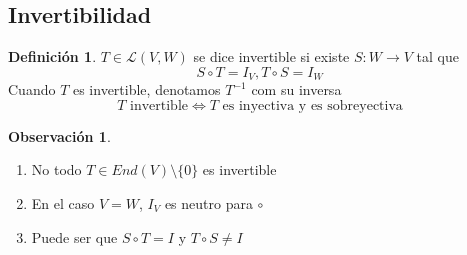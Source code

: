 \documentclass[11pt]{book}
\theoremstyle{definition}
\newtheorem{defn}{Definición}[section]
\newtheorem{obs}{Observación}[section]
\begin{document}
\subsection{Invertibilidad}
\begin{defn}
	$T\in\mathcal{L}(V,W)$ se dice invertible si existe $S:W\rightarrow V$ tal que
	\begin{equation}
		S\circ T=I_V, T\circ S=I_W
	\end{equation}
	Cuando $T$ es invertible, denotamos $T^{-1}$ com su inversa
	\[T\textrm{ invertible}\iff T\textrm{ es inyectiva y es sobreyectiva}\]
\end{defn}
\begin{obs}
	\
	\begin{enumerate}
		\item No todo $T\in End(V)\setminus\{0\}$ es invertible

		\item En el caso $V=W$, $I_V$ es neutro para $\circ$

		\item Puede ser que $S\circ T=I$ y $T\circ S\neq I$
	\end{enumerate}
\end{obs}
\end{document}
